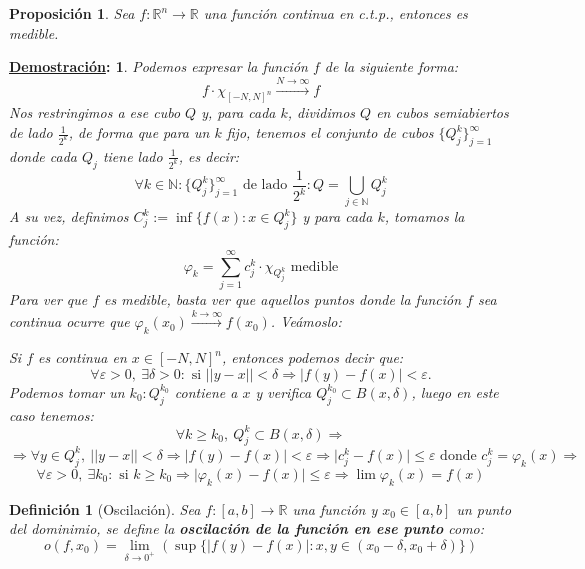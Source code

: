 \documentclass[10pt,a4paper,openright]{book}
\theoremstyle{break}
\newtheorem*{defi}{Definición}
\newtheorem*{prop}{Proposición}
\newtheorem*{demo}{\underline{Demostración}:}
\begin{document}
\begin{prop}
Sea $f: \mathbb{R}^n \rightarrow \mathbb{R}$ una función continua en c.t.p., entonces es medible.
\end{prop}
\begin{demo}
Podemos expresar la función $f$ de la siguiente forma: 
$$f\cdot \chi_{\left[-N, N\right]^{n}} \xrightarrow{N \rightarrow \infty} f$$
Nos restringimos a ese cubo $Q$ y, para cada $k$, dividimos $Q$ en cubos semiabiertos de lado $\frac{1}{2^k}$, de forma que para un $k$ fijo, tenemos el conjunto de cubos $\{Q_j^k\}_{j=1}^\infty$ donde cada $Q_j$ tiene lado $\frac{1}{2^k}$, es decir:
$$\forall k \in \mathbb{N}: \{Q_j^k\}_{j=1}^{\infty}\mbox{ de lado }\frac{1}{2^k}: Q = \bigcup_{j \in \mathbb{N}} Q_j^k $$
A su vez, definimos $C_j^k := \inf \{f\left(x\right): x \in Q_j^k\}$ y para cada $k$, tomamos la función: 
$$\varphi_k = \sum_{j = 1}^{\infty} c_j^k \cdot \chi_{Q_j^k} \text{ medible}$$
Para ver que $f$ es medible, basta ver que aquellos puntos donde la función $f$ sea continua ocurre que $\varphi_k(x_0) \xrightarrow{k\rightarrow \infty} f(x_0)$. Veámoslo:

Si $f$ es continua en $x  \in \left[-N, N\right]^n$, entonces podemos decir que:
$$\forall \varepsilon > 0,\ \exists \delta > 0: \text{ si } \vert\vert y - x \vert\vert < \delta \Rightarrow \vert f\left(y\right) - f\left(x\right)\vert < \varepsilon.$$
Podemos tomar un $k_0: Q_j^{k_0}$ contiene a $x$ y verifica $Q_j^{k_0} \subset B\left(x, \delta\right)$, luego en este caso tenemos:
$$\forall k \ge k_0,\ Q_j^k \subset B\left(x, \delta\right) \Rightarrow$$
$$\Rightarrow \forall y \in Q_j^k,\ \vert\vert y - x\vert\vert < \delta \Rightarrow \vert f\left(y\right) - f\left(x\right) \vert < \varepsilon \Rightarrow \vert c_j^k - f\left(x\right) \vert \le \varepsilon \text{ donde } c_j^k = \varphi_k\left(x\right) \Rightarrow$$
$$\forall \varepsilon > 0,\ \exists k_0: \text{ si } k \ge k_0 \Rightarrow \vert \varphi_k\left(x\right) - f\left(x\right) \vert \le \varepsilon \Rightarrow \lim \varphi_k\left(x\right) = f\left(x\right)$$
\end{demo}

\begin{defi}[Oscilación]
Sea $f: \left[a, b\right] \rightarrow \mathbb{R}$ una función y $x_0 \in \left[a, b\right]$ un punto del dominimio, se define la \textbf{oscilación de la función en ese punto} como:
$$o\left(f, x_0\right) = \lim_{\delta \rightarrow 0^+} \left(\sup \{ \vert f\left(y\right) - f\left(x\right) \vert : x, y \in \left(x_0 -\delta, x_0 + \delta \right) \} \right)$$
\end{defi}
\end{document}
